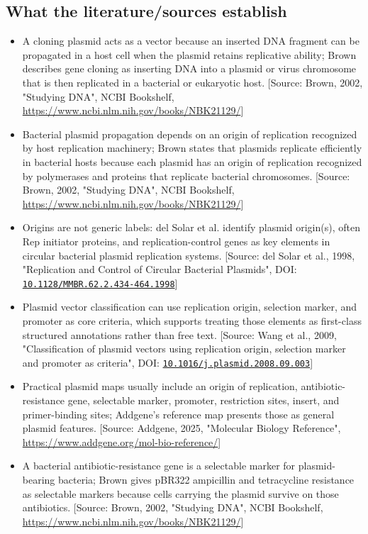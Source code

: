 \documentclass[11pt]{report}
\begin{document}
\subsection{What the literature/sources establish}
\begin{itemize}
\item A cloning plasmid acts as a vector because an inserted DNA fragment can be propagated in a host cell when the plasmid retains replicative ability; Brown describes gene cloning as inserting DNA into a plasmid or virus chromosome that is then replicated in a bacterial or eukaryotic host. [Source: Brown, 2002, "Studying DNA", NCBI Bookshelf, \url{https://www.ncbi.nlm.nih.gov/books/NBK21129/}]
\item Bacterial plasmid propagation depends on an origin of replication recognized by host replication machinery; Brown states that plasmids replicate efficiently in bacterial hosts because each plasmid has an origin of replication recognized by polymerases and proteins that replicate bacterial chromosomes. [Source: Brown, 2002, "Studying DNA", NCBI Bookshelf, \url{https://www.ncbi.nlm.nih.gov/books/NBK21129/}]
\item Origins are not generic labels: del Solar et al. identify plasmid origin(s), often Rep initiator proteins, and replication-control genes as key elements in circular bacterial plasmid replication systems. [Source: del Solar et al., 1998, "Replication and Control of Circular Bacterial Plasmids", DOI: \href{https://doi.org/10.1128/MMBR.62.2.434-464.1998}{\nolinkurl{10.1128/MMBR.62.2.434-464.1998}}]
\item Plasmid vector classification can use replication origin, selection marker, and promoter as core criteria, which supports treating those elements as first-class structured annotations rather than free text. [Source: Wang et al., 2009, "Classification of plasmid vectors using replication origin, selection marker and promoter as criteria", DOI: \href{https://doi.org/10.1016/j.plasmid.2008.09.003}{\nolinkurl{10.1016/j.plasmid.2008.09.003}}]
\item Practical plasmid maps usually include an origin of replication, antibiotic-resistance gene, selectable marker, promoter, restriction sites, insert, and primer-binding sites; Addgene's reference map presents those as general plasmid features. [Source: Addgene, 2025, "Molecular Biology Reference", \url{https://www.addgene.org/mol-bio-reference/}]
\item A bacterial antibiotic-resistance gene is a selectable marker for plasmid-bearing bacteria; Brown gives pBR322 ampicillin and tetracycline resistance as selectable markers because cells carrying the plasmid survive on those antibiotics. [Source: Brown, 2002, "Studying DNA", NCBI Bookshelf, \url{https://www.ncbi.nlm.nih.gov/books/NBK21129/}]

\end{itemize}
\end{document}
